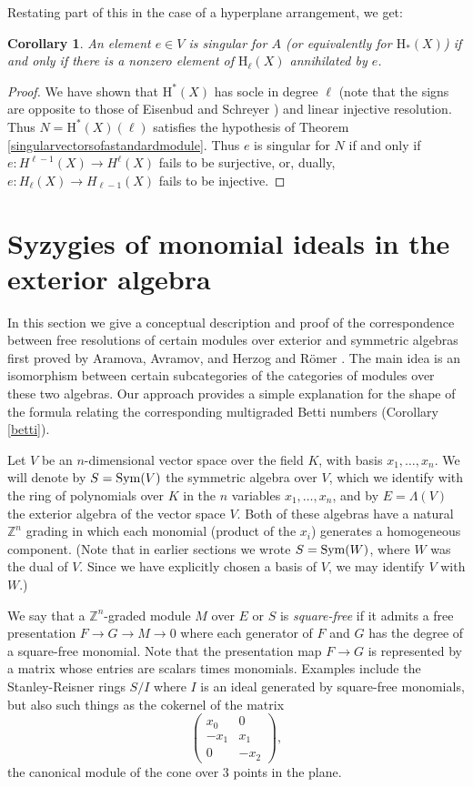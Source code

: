 \documentclass{tran-l}
\newtheorem{corollary}[theorem]{Corollary}
\theoremstyle{definition}
\theoremstyle{remark}
\newcommand{\Z}{{\mathbb{Z}}}
\newcommand{\rH}{{\mathrm H}}
\newcommand{\Sym}{\mathop{\rm Sym}\nolimits}
\begin{document}
Restating part of this in the case of a hyperplane arrangement,
we get:

\begin{corollary}\label{highesthom}
An element $e\in V$ is singular
for $A$ (or equivalently for $\rH_*(X)$) 
if and only if
there is a nonzero element of $\rH_\ell(X)$ 
annihilated by $e$.\end{corollary}

\begin{proof} We have shown that $\rH^*(X)$ has socle in degree $\ell$
(note that the signs are opposite to those of Eisenbud and Schreyer \cite{ES})
and linear injective resolution. Thus $N=\rH^*(X)(\ell)$ satisfies
the hypothesis of Theorem \ref{singularvectorsofastandardmodule}.
Thus $e$ is singular for $N$ if and only if 
$e: H^{\ell-1}(X)\to H^\ell(X)$ fails to be surjective, or,
dually, $e:H_\ell(X)\to H_{\ell-1}(X)$ fails to be injective.
\end{proof}

\section{Syzygies of monomial ideals in the exterior algebra}\label{Appendix}

In this section we give a conceptual description and proof of the
correspondence between free resolutions of certain modules over exterior
and symmetric algebras first proved by Aramova, Avramov, and Herzog
\cite{AAH} and R\"omer \cite{Ro}.  The main idea is an isomorphism between
certain subcategories of the categories of modules over these two
algebras. Our approach provides a simple explanation for the shape of the
formula relating the corresponding multigraded Betti numbers 
(Corollary \ref{betti}).

Let $V$ be an $n$-dimensional vector space over the field $K$, with
basis $x_1,\ldots,x_n$. We will denote by $S=\Sym(V)$ 
the symmetric algebra over $V$,  which we identify with 
the ring of polynomials over $K$ in the $n$ variables $x_1,\ldots,x_n$,
and by $E=\Lambda(V)$ the exterior algebra of the vector space 
$V$. Both of these algebras have a natural $\Z^n$ grading in which each
monomial (product of the $x_i$) generates a homogeneous component.
(Note that in earlier sections we wrote $S=\Sym(W)$, where
$W$ was the dual of $V$. Since we have explicitly chosen
a basis of $V$, we may identify $V$ with $W$.)

We say that a $\Z^n$-graded module $M$ over $E$ or $S$ is
{\it square-free\/} if it admits a free presentation 
$F\to G\to M\to 0$ where each generator of $F$ and $G$ has the 
degree of a square-free monomial. Note that the presentation map
$F\to G$ is represented by a matrix whose entries are scalars
times monomials. Examples include the 
Stanley-Reisner rings $S/I$ where $I$ is an ideal generated by
square-free monomials, but also such things as the cokernel of 
the matrix
\[\begin{pmatrix}
x_0 &0 \\
-x_1 &x_1 \\
0 & -x_2\end{pmatrix},
\]
the canonical module of the cone over 3 points in the plane.
\end{document}

